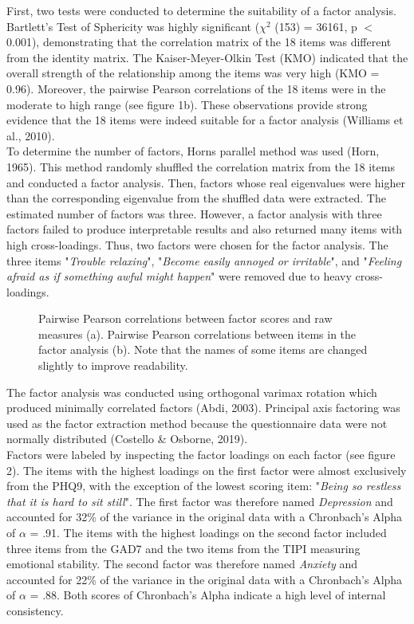 \documentclass[11pt, a4paper]{article}
\begin{document}
First, two tests were conducted to determine the suitability of a factor analysis. Bartlett’s Test of Sphericity was highly significant ($\chi^2$ (153) = 36161, p $<$ 0.001), demonstrating that the correlation matrix of the 18 items was different from the identity matrix. The Kaiser-Meyer-Olkin Test (KMO) indicated that the overall strength of the relationship among the items was very high (KMO = 0.96). Moreover, the pairwise Pearson correlations of the 18 items were in the moderate to high range (see figure 1b). These observations provide strong evidence that the 18 items were indeed suitable for a factor analysis (Williams et al., 2010). \\

To determine the number of factors, Horns parallel method was used (Horn, 1965). This method randomly shuffled the correlation matrix from the 18 items and conducted a factor analysis. Then, factors whose real eigenvalues were higher than the corresponding eigenvalue from the shuffled data were extracted. The estimated number of factors was three. However, a factor analysis with three factors failed to produce interpretable results and also returned many items with high cross-loadings. Thus, two factors were chosen for the factor analysis. The three items "\textit{Trouble relaxing}", "\textit{Become easily annoyed or irritable}", and "\textit{Feeling afraid as if something awful might happen}" were removed due to heavy cross-loadings.\\

\begin{figure}
\centering
\vspace{-1cm}

\caption{\label{fig:data} Pairwise Pearson correlations between factor scores and raw measures (a). Pairwise Pearson correlations between items in the factor analysis (b). Note that the names of some items are changed slightly to improve readability. }
\end{figure}

The factor analysis was conducted using orthogonal varimax rotation which produced minimally correlated factors (Abdi, 2003). Principal axis factoring was used as the factor extraction method because the questionnaire data were not normally distributed (Costello \& Osborne, 2019). \\

Factors were labeled by inspecting the factor loadings on each factor (see figure 2). The items with the highest loadings on the first factor were almost exclusively from the PHQ9, with the exception of the lowest scoring item: "\textit{Being so restless that it is hard to sit still}". The first factor was therefore named \textit{Depression} and accounted for 32\% of the variance in the original data with a Chronbach’s Alpha of $\alpha$ = .91. The items with the highest loadings on the second factor included three items from the GAD7 and the two items from the TIPI measuring emotional stability. The second factor was therefore named \textit{Anxiety} and accounted for 22\% of the variance in the original data with a Chronbach’s Alpha of $\alpha$ = .88. Both scores of Chronbach’s Alpha indicate a high level of internal consistency. \\
\end{document}
